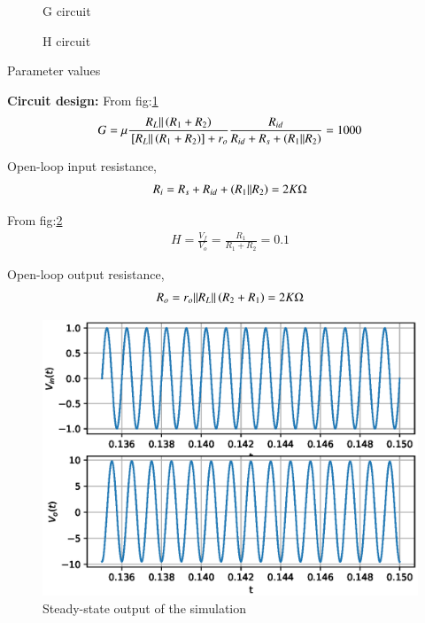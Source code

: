 \begin{enumerate}[label=\thesubsection.\arabic*.,ref=\thesubsection.\theenumi]
\begin{figure}[!h]
		\resizebox{\columnwidth}{!}{}
\caption{G circuit}
\label{fig:ee18btech11039_fig4}
\end{figure}

\begin{figure}[!h]
		\resizebox{\columnwidth}{!}{}
\caption{H circuit}
\label{fig:ee18btech11039_fig5}
\end{figure}

\begin{table}[!h]
\centering

\caption{Parameter values}
\label{table:ee18btech11039_tab2}
\end{table}

\textbf{Circuit design: }
From fig:\ref{fig:ee18btech11039_fig4}
\begin{align}
G = \mu \frac{R_L || \left(R_1 + R_2\right)}{{}\left[R_L || \left(R_1 + R_2\right)\right]+r_o} \frac{R_{id}}{R_{id}+R_s+\left(R_1||R_2\right)} = 1000
\end{align}

Open-loop input resistance,
\begin{align}
     R_i =  R_s + R_{id} + \left(R_1 || R_2\right) = 2K\ohm
\end{align}

From fig:\ref{fig:ee18btech11039_fig5}
\begin{align}
H = \frac{V_f}{V_o} = \frac{R_1}{R_1 + R_2} = 0.1
\end{align}

Open-loop output resistance,
\begin{align}
      R_o = r_o || R_L || \left(R_2 + R_1\right) = 2K\ohm
\end{align}


\begin{figure}[!h]
		\includegraphics[width=\columnwidth]{./figs/ee18btech11039/spice_1.eps}
\caption{Steady-state output of the simulation}
\label{fig:ee18btech11039_fig6}
\end{figure}

\end{enumerate}
